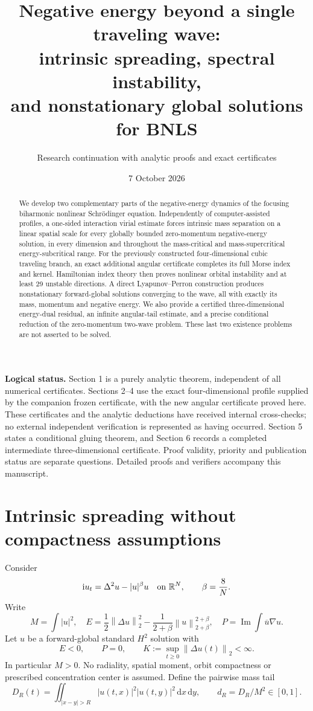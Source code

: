 \documentclass[11pt,a4paper]{article}
\title{Negative energy beyond a single traveling wave:\\intrinsic spreading, spectral instability,\\and nonstationary global solutions for BNLS}
\author{Research continuation with analytic proofs and exact certificates}
\date{7 October 2026}
\theoremstyle{remark}\newtheorem{remark}[theorem]{Remark}
\newcommand{\R}{\mathbb R}\newcommand{\C}{\mathbb C}
\newcommand{\ii}{\mathrm i}\newcommand{\dd}{\,\mathrm d}
\newcommand{\norm}[1]{\left\|#1\right\|}
\newcommand{\Imn}{\operatorname{Im}}\newcommand{\Ren}{\operatorname{Re}}
\begin{document}
\maketitle
\begin{abstract}
We develop two complementary parts of the negative-energy dynamics of the focusing biharmonic nonlinear Schr\"odinger equation. Independently of computer-assisted profiles, a one-sided interaction virial estimate forces intrinsic mass separation on a linear spatial scale for every globally bounded zero-momentum negative-energy solution, in every dimension and throughout the mass-critical and mass-supercritical energy-subcritical range. For the previously constructed four-dimensional cubic traveling branch, an exact additional angular certificate completes its full Morse index and kernel. Hamiltonian index theory then proves nonlinear orbital instability and at least 29 unstable directions. A direct Lyapunov--Perron construction produces nonstationary forward-global solutions converging to the wave, all with exactly its mass, momentum and negative energy. We also provide a certified three-dimensional energy-dual residual, an infinite angular-tail estimate, and a precise conditional reduction of the zero-momentum two-wave problem. These last two existence problems are not asserted to be solved.
\end{abstract}

\noindent\textbf{Logical status.} Section 1 is a purely analytic theorem, independent of all numerical certificates. Sections 2--4 use the exact four-dimensional profile supplied by the companion frozen certificate, with the new angular certificate proved here. These certificates and the analytic deductions have received internal cross-checks; no external independent verification is represented as having occurred. Section 5 states a conditional gluing theorem, and Section 6 records a completed intermediate three-dimensional certificate. Proof validity, priority and publication status are separate questions. Detailed proofs and verifiers accompany this manuscript.

\section{Intrinsic spreading without compactness assumptions}
Consider
\begin{equation}\label{eq:bnls}
 \ii u_t=\Delta^2u-|u|^\beta u\quad\hbox{on }\R^N,
 \qquad \beta=\frac8N.
\end{equation}
Write
\[
 M=\int|u|^2,\quad E=\frac12\norm{\Delta u}_2^2-
 \frac1{2+\beta}\norm u_{2+\beta}^{2+\beta},\quad
 P=\Imn\int\overline u\nabla u.
\]
Let $u$ be a forward-global standard $H^2$ solution with
\begin{equation}\label{eq:escapehyp}
 E<0,\qquad P=0,\qquad K:=\sup_{t\ge0}\norm{\Delta u(t)}_2<\infty.
\end{equation}
In particular $M>0$. No radiality, spatial moment, orbit compactness or prescribed concentration center is assumed. Define the pairwise mass tail
\[
 D_R(t)=\iint_{|x-y|>R}|u(t,x)|^2|u(t,y)|^2\dd x\dd y,
 \qquad d_R=D_R/M^2\in[0,1].
\]
\end{document}
